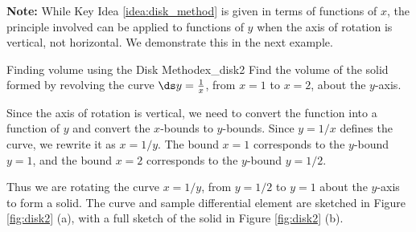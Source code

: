\textbf{Note:} While Key Idea \ref{idea:disk_method} is given in terms of functions of $x$, the principle involved can be applied to functions of $y$ when the axis of rotation is vertical, not horizontal. We demonstrate this in the next example.\\

\clearpage

\begin{example}{Finding volume using the Disk Method}{ex_disk2}{
	Find the volume of the solid formed by revolving the curve $\ds y=\frac1x$, from $x=1$ to $x=2$, about the $y$-axis.}	
\end{example}

\begin{solution}
{Since the axis of rotation is vertical, we need to convert the function into a function of $y$ and convert the $x$-bounds to $y$-bounds. Since $y=1/x$ defines the curve, we rewrite it as $x=1/y$. The bound $x=1$ corresponds to the $y$-bound $y=1$, and the bound $x=2$ corresponds to the $y$-bound $y=1/2$. 
	
Thus we are rotating the curve $x=1/y$, from $y=1/2$ to $y=1$ about the $y$-axis to form a solid. The curve and sample differential element are sketched in Figure \ref{fig:disk2} (a), with a full sketch of the solid in Figure \ref{fig:disk2} (b).
	
	


}
\end{solution}
